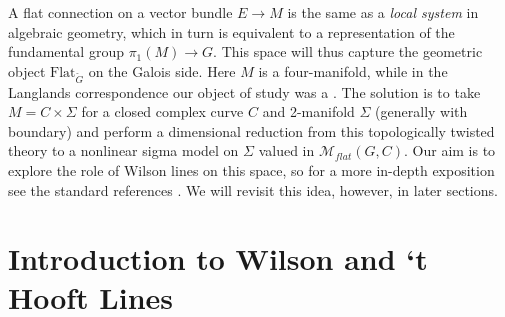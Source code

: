 	A flat connection on a vector bundle $E \to M$ is the same as a \emph{local system} in algebraic geometry, which in turn is equivalent to a representation of the fundamental group $\pi_1(M) \to G$.
	 This space will thus capture the geometric object $\mathrm{Flat}_{\check G}$ on the Galois side. Here $M$ is a four-manifold, while in the Langlands correspondence our object of study was a . The solution is to take $M = C \times \Sigma$ for a closed complex curve $C$ and 2-manifold $\Sigma$ (generally with boundary) and perform a dimensional reduction from this topologically twisted theory to a nonlinear sigma model on $\Sigma$ valued in $\mathcal M_{flat}(G, C)$.
	 Our aim is to explore the role of Wilson lines on this space, so for a more in-depth exposition see the standard references \cite{kapustin2006, kapustin2008}. We will revisit this idea, however, in later sections. 
	




\section{Introduction to Wilson and `t Hooft Lines} %
\label{sec:introduction_to_wilson_and_t_hooft_lines}

